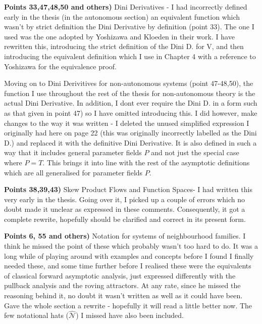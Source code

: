 \documentclass[12pt]{book}
\begin{document}
\textbf{Points 33,47,48,50 and others)} Dini Derivatives - I had incorrectly defined early in the thesis (in the autonomous section) an equivalent function which wasn't by strict definition the Dini Derivative by definition (point 33). The one I used was the one adopted by Yoshizawa and Kloeden in their work. I have rewritten this, introducing the strict definition of the Dini D. for V, and then introducing the equivalent definition which I use in Chapter 4 with a reference to Yoshizawa for the equivalence proof. 

Moving on to Dini Derivitives for non-autonomous systems (point 47-48,50), the function I use throughout the rest of the thesis for non-autonomous theory is the actual Dini Derivative. In addition, I dont ever require the Dini D. in a form such as that given in point 47) so I have omitted introducing this. I did however, make changes to the way it was written - I deleted the unused simplified expression I originally had here on page 22 (this was originally incorrectly labelled as the Dini D.) and replaced it with the definitive Dini Derivative. It is also defined in such a way that it includes general parameter fields $P$ and not just the special case where $P = T$. This brings it into line with the rest of the asymptotic definitions which are all generalised for parameter fields $P$.

\textbf{Points 38,39,43)} Skew Product Flows and Function Spaces- I had written this very early in the thesis. Going over it, I picked up a couple of errors which no doubt made it unclear as expressed in these comments. Consequently, it got a complete rewrite, hopefully should be clarified and correct in its present form.

\textbf{Points 6, 55 and others)} Notation for systems of neighbourhood families. I think he missed
the point of these which probably wasn't too hard to do. It was a long while of playing around with examples and concepts before I found I finally needed these, and some time further before I realised these were the equivalents of classical forward asymptotic analysis, just expressed differently with the pullback analysis and the roving attractors. At any rate, since he missed the reasoning behind it, no doubt it wasn't written as well as it could have been. Gave the whole section a rewrite - hopefully it will read a little better now. The few notational hats ($\hat{\mathcal{N}}$) I missed have also been included.
\end{document}
